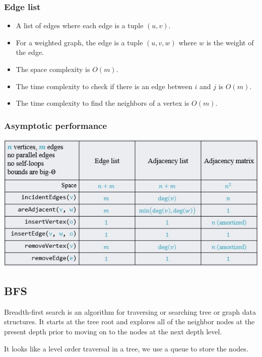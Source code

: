 \documentclass[letterpaper,12pt]{article}
\begin{document}
\subsubsection{Edge list}
\begin{itemize}
    \item A list of edges where each edge is a tuple $(u,v)$.
    \item For a weighted graph, the edge is a tuple $(u,v,w)$ where $w$ is the weight of the edge.
    \item The space complexity is $O(m)$.
    \item The time complexity to check if there is an edge between $i$ and $j$ is $O(m)$.
    \item The time complexity to find the neighbors of a vertex is $O(m)$.
\end{itemize}
\subsubsection{Asymptotic performance}
\includegraphics*{./Images/Graph asymtotic performance.jpg}
\subsection{BFS}
Breadth-first search is an algorithm for traversing or searching tree or graph data structures. It starts at the tree root and explores all of the neighbor nodes at the present depth prior to moving on to the nodes at the next depth level.

It looks like a level order traversal in a tree, we use a queue to store the nodes.
\begin{algorithmic}
        \EndIf
    \EndFor
\EndWhile
\end{algorithmic}
\end{document}
